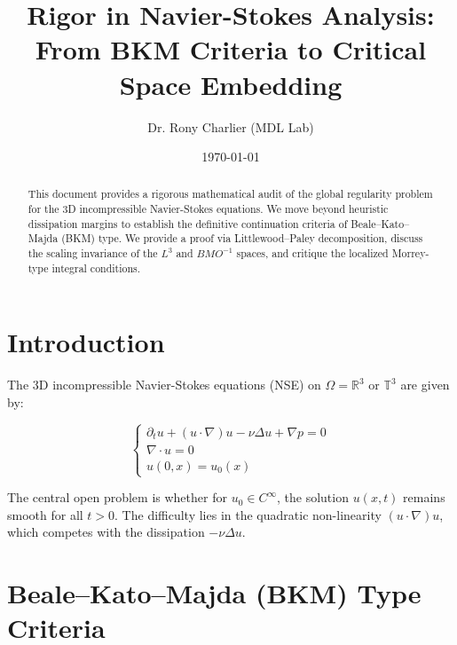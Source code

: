 \documentclass[11pt,a4paper]{amsart}
\title{Rigor in Navier-Stokes Analysis: \\ 

From BKM Criteria to Critical Space Embedding}
\author{Dr. Rony Charlier (MDL Lab)}
\date{\today}
\newcommand{\R}{\mathbb{R}}
\newcommand{\T}{\mathbb{T}}
\begin{document}
\begin{abstract}

This document provides a rigorous mathematical audit of the global regularity problem for the 3D incompressible Navier-Stokes equations. We move beyond heuristic dissipation margins to establish the definitive continuation criteria of Beale--Kato--Majda (BKM) type. We provide a proof via Littlewood--Paley decomposition, discuss the scaling invariance of the $L^3$ and $BMO^{-1}$ spaces, and critique the localized Morrey-type integral conditions.

\end{abstract}



\maketitle



\section{Introduction}



The 3D incompressible Navier-Stokes equations (NSE) on $\Omega = \R^3$ or $\T^3$ are given by:

\begin{equation} \label{eq:nse}

\begin{cases}

\partial_t u + (u \cdot \nabla) u - \nu \Delta u + \nabla p = 0 \\

\nabla \cdot u = 0 \\

u(0, x) = u_0(x)

\end{cases}

\end{equation}

The central open problem is whether for $u_0 \in C^\infty$, the solution $u(x,t)$ remains smooth for all $t > 0$. The difficulty lies in the quadratic non-linearity $(u \cdot \nabla) u$, which competes with the dissipation $-\nu \Delta u$.



\section{Beale--Kato--Majda (BKM) Type Criteria}
\end{document}
